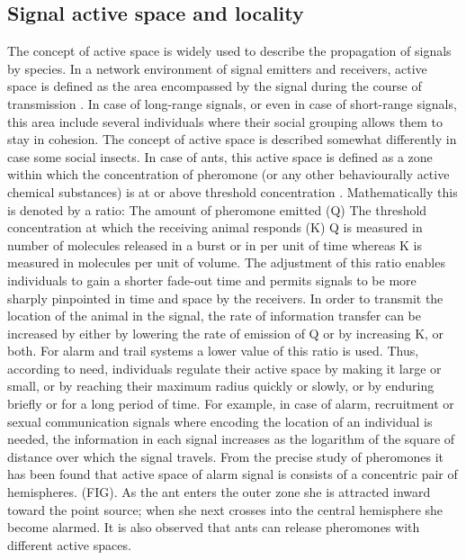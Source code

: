 \subsection{Signal active space and locality}
The concept of active space is widely used to describe the propagation of signals by species. In a network environment of signal emitters and receivers, active space is defined as the area encompassed by the signal  during the course of transmission \cite{Mcgregor2000}. In case of long-range signals, or even in case of short-range signals, this area include several individuals where their social grouping allows them to stay in cohesion. The concept of active space is described somewhat differently in case some social insects. In case of ants, this active space is defined as a zone within which the concentration of pheromone (or any other behaviourally active chemical substances) is  at or above threshold concentration \cite{Holldobler1990}. Mathematically this is denoted by a ratio:
The amount of pheromone emitted (Q)
The threshold concentration at which the receiving animal responds (K)
Q is measured in number of molecules released in a burst or in per unit of time whereas K is measured in molecules per unit of volume.
The adjustment of this ratio enables individuals to gain a shorter fade-out time and permits signals to be more sharply pinpointed in time and space by the receivers. In order to transmit the location of the animal in the signal, the rate of information transfer can be increased by either by lowering the rate of emission of Q or by increasing K, or both.  For alarm and trail systems a lower value of this ratio is used. Thus, according to need, individuals regulate their active space by making it large or small, or by reaching their maximum radius quickly or slowly, or by enduring briefly or for a long period of time. For example, in case of alarm, recruitment or sexual communication signals where encoding the location of an individual is needed, the information in each signal increases as the logarithm of the square of distance over which the signal travels. From the precise study of pheromones it has been found that active space of alarm signal is consists of  a concentric pair of hemispheres. (FIG). As the ant enters the outer zone she is attracted inward toward the point source; when she next crosses into the central hemisphere she become alarmed. It is also observed that ants can release pheromones with different active spaces.

